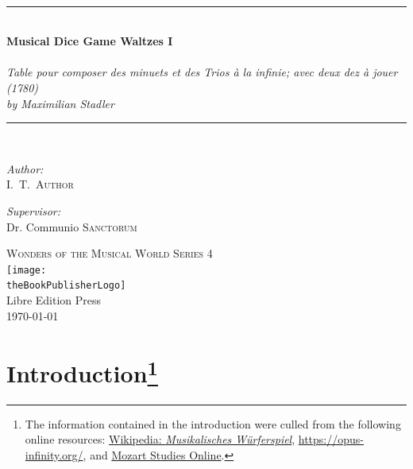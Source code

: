 \documentclass[a4paper,x11names,svgnames,10pt]{article}
\title{\textsc{\mdgBookTitle}}
\author{\textsc{\authorFirstMidNameInit \authorLastName}}
\date{\textsc{\dateGenerated}}
\def\authorFirstMidNameInit{I.\ T.\ }
\def\authorLastName{Author}
\def\dateGenerated{\today}
\def\volNumber{I}
\def\mdgBookTitle{Musical Dice Game Waltzes \volNumber}
\def\mdgBookSubTitle{\hspace{.10in}{\small ${}$\\ based on}\\ \hspace{.15in}Table pour composer des minuets et des Trios \`{a} la infinie; avec deux dez \`{a} jouer (1780) \\ \hspace{.10in}by Maximilian Stadler}
\def\theBookSeries{Wonders of the Musical World Series 4}
\def\theBookPublisher{Libre Edition Press}
\def\theBookPublisherLogo{../images/1ed.png}
\newcommand{\HRule}{\rule{\linewidth}{0.5mm}}
\begin{document}


\newpage
{
${}_{}$\\
\vspace{1.00in}	
\thispagestyle{empty}
\begin{center}
	\HRule \\[0.4cm]
	{\huge \bfseries \mdgBookTitle} \\[0.2cm]
	{\large{\em \mdgBookSubTitle} }\\[0.2cm]
	\HRule \\[1.5cm]
	\begin{minipage}{0.4\textwidth}
		\begin{flushleft} \large
			\emph{Author:}\\
			\authorFirstMidNameInit \textsc{\authorLastName}
		\end{flushleft}
	\end{minipage}
	\begin{minipage}{0.4\textwidth}
		\begin{flushright} \large
			\emph{Supervisor:} \\
			Dr. Communio \textsc{Sanctorum}
		\end{flushright}
	\end{minipage}
	\vfill
	{\textsc{\Large \theBookSeries}}  \\[0.2cm] 
	\texttt{[image: \\theBookPublisherLogo]}\\ 
	{\large \theBookPublisher \\
       \dateGenerated }\\
	\vspace{2.50in}
\end{center}
\newpage


\tableofcontents\label{tabofcon}
\newpage


\baselineskip 14pt

\section[Introduction]{Introduction\footnote{The information contained in the introduction were culled from the following online resources:
	\href{https://en.wikipedia.org/w/index.php?title=Musikalisches\_W\%C3\%BCrfelspiel&oldid=787418377}{Wikipedia: {\em Musikalisches W\"{u}rferspiel}}, %
	\url{https://opus-infinity.org/}, and 
	\href{(http://www.asahi-net.or.jp/\~rb5h-ngc/e/k516f.htm}{Mozart Studies Online}.
	}
}

}
\end{document}
